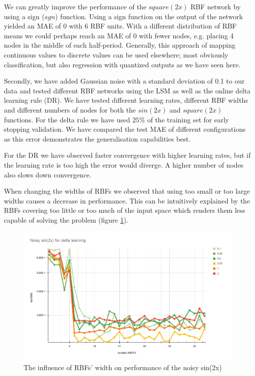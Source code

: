 \documentclass[a4paper]{article}
\begin{document}
We can greatly improve the performance of the $square(2x)$ RBF network by using a sign ($sgn$) function. Using a sign function on the output of the network yielded an MAE of 0 with 6 RBF units. With a different distribution of RBF means we could perhaps reach an MAE of 0 with fewer nodes, e.g. placing 4 nodes in the middle of each half-period. Generally, this approach of mapping continuous values to discrete values can be used elsewhere; most obviously classification, but also regression with quantized outputs as we have seen here.

Secondly, we have added Gaussian noise with a standard deviation of 0.1 to our data and tested different RBF networks using the LSM as well as the online delta learning rule (DR). We have tested different learning rates, different RBF widths and different numbers of nodes for both the $sin(2x)$ and $square(2x)$ functions. For the delta rule we have used $25\%$ of the training set for early stopping validation. We have compared the test MAE of different configurations as this error demonstrates the generalisation capabilities best.

For the DR we have observed faster convergence with higher learning rates, but if the learning rate is too high the error would diverge. A higher number of nodes also slows down convergence.

When changing the widths of RBFs we observed that using too small or too large widths causes a decrease in performance. This can be intuitively explained by the RBFs covering too little or too much of the input space which renders them less capable of solving the problem (figure \ref{fig:3-2_rbf_width}).

\begin{figure}[h!]
    \centering
    \includegraphics[width=0.8\linewidth]{img/3-2_widths.png}%
    \caption{The influence of RBFs' width on performance of the noisy sin(2x)}
    \label{fig:3-2_rbf_width}
\end{figure}
\end{document}

